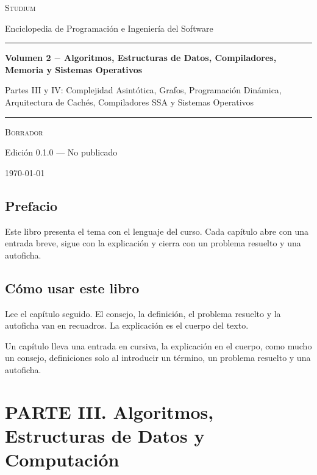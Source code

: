 \documentclass{book}
\begin{document}
\frontmatter
\thispagestyle{empty}
\setlength{\parindent}{0pt}
\vspace*{0.08\textheight}
{\normalsize\scshape\color{studiumInk} Studium\par}
{\small Enciclopedia de Programación e Ingeniería del Software\par}
\vspace{0.55em}
{\color{studiumRule}\rule{\linewidth}{0.9pt}\par}
\vspace{0.16\textheight}
{\raggedright\Huge\bfseries Volumen 2 \(-\) Algoritmos, Estructuras de Datos, Compiladores, Memoria y Sistemas Operativos\par}
\vspace{0.9em}
{\raggedright\Large\color{studiumInk} Partes III y IV: Complejidad Asintótica, Grafos, Programación Dinámica, Arquitectura de Cachés, Compiladores SSA y Sistemas Operativos\par}
\vfill
{\color{studiumRule}\rule{0.36\linewidth}{0.45pt}\par}
\vspace{1.05em}
{\large\scshape Borrador\par}
\vspace{0.45em}
{\normalsize Edición 0.1.0 --- No publicado\par}
\vspace{0.4em}
{\normalsize\today\par}
\vspace*{0.08\textheight}
\clearpage
\chapter{Prefacio}
\noindent Este libro presenta el tema con el lenguaje del curso. Cada capítulo abre con una entrada breve, sigue con la explicación y cierra con un problema resuelto y una autoficha.
\chapter{Cómo usar este libro}
\noindent Lee el capítulo seguido. El consejo, la definición, el problema resuelto y la autoficha van en recuadros. La explicación es el cuerpo del texto.

\noindent Un capítulo lleva una entrada en cursiva, la explicación en el cuerpo, como mucho un consejo, definiciones solo al introducir un término, un problema resuelto y una autoficha.
\tableofcontents
\mainmatter

\part{PARTE III. Algoritmos, Estructuras de Datos y Computación}
\end{document}
